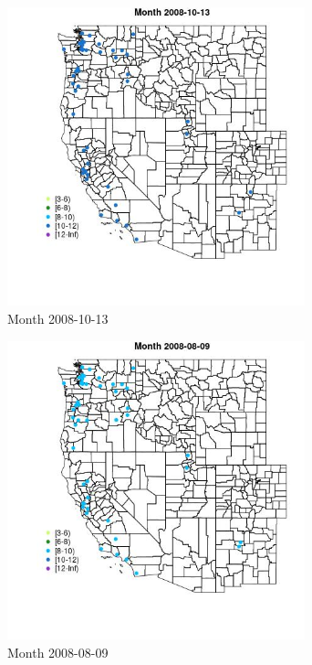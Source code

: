 \begin{figure} 
\centering  
\includegraphics[width=0.77\textwidth]{Code_Outputs/Report_ML_input_PM25_Step4_part_e_de_duplicated_aves_MapObsMonth2008-10-13.jpg} 
\caption{\label{fig:Report_ML_input_PM25_Step4_part_e_de_duplicated_avesMapObsMonth2008-10-13}Month 2008-10-13} 
\end{figure} 
 

\clearpage 

\begin{figure} 
\centering  
\includegraphics[width=0.77\textwidth]{Code_Outputs/Report_ML_input_PM25_Step4_part_e_de_duplicated_aves_MapObsMonth2008-08-09.jpg} 
\caption{\label{fig:Report_ML_input_PM25_Step4_part_e_de_duplicated_avesMapObsMonth2008-08-09}Month 2008-08-09} 
\end{figure} 
 

